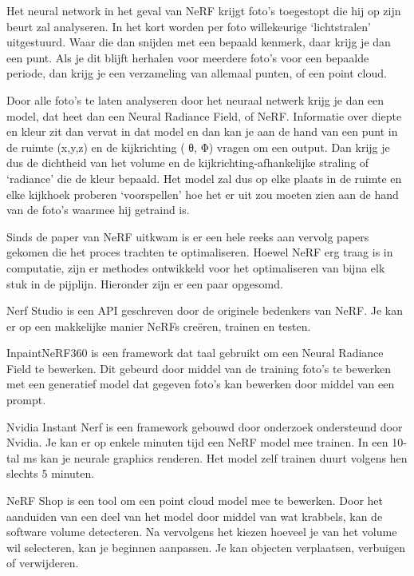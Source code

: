 Het neural network in het geval van NeRF krijgt foto’s toegestopt die hij op zijn beurt zal analyseren. In het kort worden per foto willekeurige ‘lichtstralen’ uitgestuurd. Waar die dan snijden met een bepaald kenmerk, daar krijg je dan een punt. Als je dit blijft herhalen voor meerdere foto’s voor een bepaalde periode, dan krijg je een verzameling van allemaal punten, of een point cloud.

Door alle foto’s te laten analyseren door het neuraal netwerk krijg je dan een model, dat heet dan een Neural Radiance Field, of NeRF. Informatie over diepte en kleur zit dan vervat in dat model en dan kan je aan de hand van een punt in de ruimte (x,y,z) en de kijkrichting ( θ, Φ) vragen om een output. Dan krijg je dus de dichtheid van het volume en de kijkrichting-afhankelijke straling of ‘radiance’ die de kleur bepaald. Het model zal dus  op elke plaats in de ruimte en elke kijkhoek proberen ‘voorspellen’ hoe het er uit zou moeten zien aan de hand van de foto’s waarmee hij getraind is. \autocite{Mildenhall2020}

Sinds de paper van NeRF uitkwam is er een hele reeks aan vervolg papers gekomen die het proces trachten te optimaliseren. Hoewel NeRF erg traag is in computatie, zijn er methodes ontwikkeld voor het optimaliseren van bijna elk stuk in de pijplijn. Hieronder zijn er een paar opgesomd.

Nerf Studio is een API  geschreven door de originele bedenkers van NeRF. Je kan er op een makkelijke manier NeRFs creëren, trainen en testen. \autocite{Tancik2023a}

InpaintNeRF360 is een framework dat taal gebruikt om een Neural Radiance Field te bewerken. Dit gebeurd door middel van de training foto’s te bewerken met een generatief model dat gegeven foto’s kan bewerken door middel van een prompt. \autocite{Wang2023a}


Nvidia Instant Nerf is een framework gebouwd door onderzoek ondersteund door Nvidia. Je kan er op enkele minuten tijd een NeRF model mee trainen. In een 10-tal ms kan je neurale graphics renderen. Het model zelf trainen duurt volgens hen slechts 5 minuten.
\autocite{Mueller2022}

NeRF Shop is een tool om een point cloud model mee te bewerken. Door het aanduiden van een deel van het model door middel van wat krabbels, kan de software volume detecteren. Na vervolgens het kiezen hoeveel je van het volume wil selecteren, kan je beginnen aanpassen.
Je kan objecten verplaatsen, verbuigen of verwijderen.\autocite{NeRFshop23}

